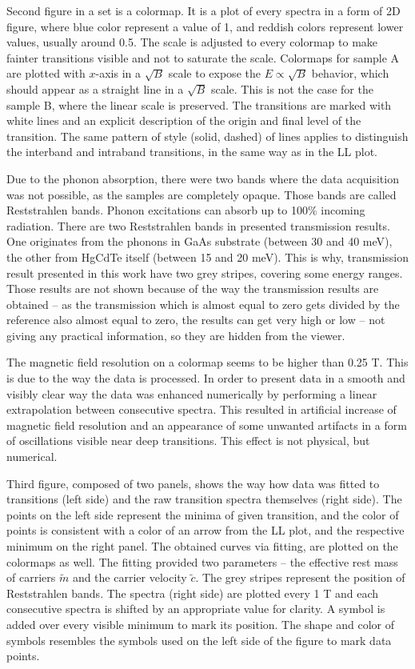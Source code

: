 \documentclass[titlepage,a4paper]{book}
\begin{document}
Second figure in a set is a colormap. It is a plot of every spectra in a form of 2D figure, where blue color represent a value of 1, and reddish colors represent lower values, usually around 0.5. The scale is adjusted to every colormap to make fainter transitions visible and not to saturate the scale. Colormaps for sample A are plotted with $x$-axis in a $\sqrt{B}$ scale to expose the $E \propto \sqrt{B}$ behavior, which should appear as a straight line in a $\sqrt{B}$ scale. This is not the case for the sample B, where the linear scale is preserved. The transitions are marked with white lines and an explicit description of the origin and final level of the transition. The same pattern of style (solid, dashed) of lines applies to distinguish the interband and intraband transitions, in the same way as in the LL plot. 

Due to the phonon absorption, there were two bands where the data acquisition was not possible, as the samples are completely opaque. Those bands are called Reststrahlen bands. Phonon excitations can absorb up to 100\% incoming radiation. There are two Reststrahlen bands in presented transmission results. One originates from the phonons in GaAs substrate (between 30 and 40 meV), the other from HgCdTe itself (between 15 and 20 meV). This is why, transmission result presented in this work have two grey stripes, covering some energy ranges. Those results are not shown because of the way the transmission results are obtained -- as the transmission which is almost equal to zero gets divided by the reference also almost equal to zero, the results can get very high or low -- not giving any practical information, so they are hidden from the viewer.

The magnetic field resolution on a colormap seems to be higher than 0.25 T. This is due to the way the data is processed. In order to present data in a smooth and visibly clear way the data was enhanced numerically by performing a linear extrapolation between consecutive spectra. This resulted in artificial increase of magnetic field resolution and an appearance of some unwanted artifacts in a form of oscillations visible near deep transitions. This effect is not physical, but numerical.  

Third figure, composed of two panels, shows the way how data was fitted to transitions (left side) and the raw transition spectra themselves (right side). The points on the left side represent the minima of given transition, and the color of points is consistent with a color of an arrow from the LL plot, and the respective minimum on the right panel. The obtained curves via fitting, are plotted on the colormaps as well. The fitting provided two parameters -- the effective rest mass of carriers $\tilde{m}$ and the carrier velocity $\tilde{c}$. The grey stripes represent the position of Reststrahlen bands. The spectra (right side) are plotted every 1 T and each consecutive spectra is shifted by an appropriate value for clarity. A symbol is added over every visible minimum to mark its position. The shape and color of symbols resembles the symbols used on the left side of the figure to mark data points. 
\end{document}

